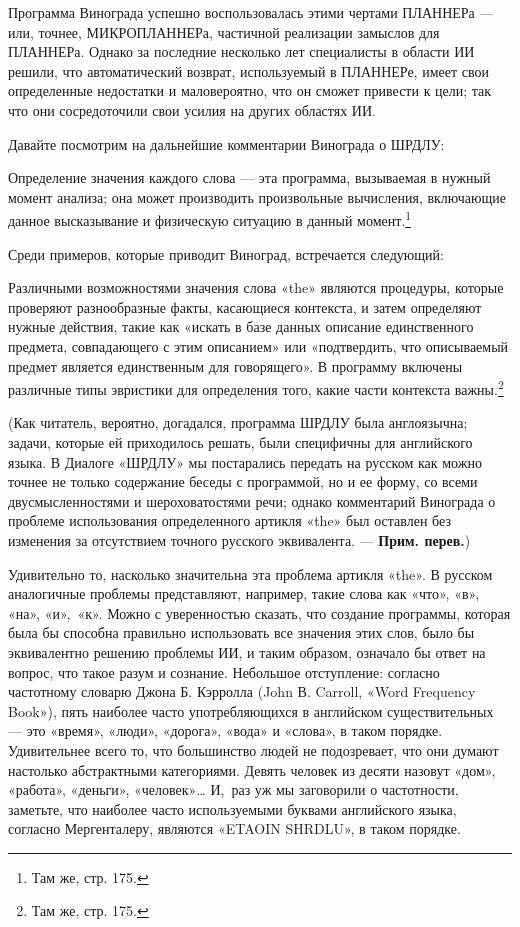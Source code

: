 \documentclass[../main.tex]{subfiles}
\begin{document}
Программа Винограда успешно воспользовалась этими чертами ПЛАННЕРа --- или, точнее, МИКРОПЛАННЕРа, частичной реализации замыслов для ПЛАННЕРа. Однако за последние несколько лет специалисты в области ИИ решили, что автоматический возврат, используемый в ПЛАННЕРе, имеет свои определенные недостатки и маловероятно, что он сможет привести к цели; так что они сосредоточили свои усилия на других областях ИИ.

Давайте посмотрим на дальнейшие комментарии Винограда о ШРДЛУ:

Определение значения каждого слова --- эта программа, вызываемая в нужный момент анализа; она может производить произвольные вычисления, включающие данное высказывание и физическую ситуацию в данный момент.\footnote{Там же, стр. 175.}

Среди примеров, которые приводит Виноград, встречается следующий:

Различными возможностями значения слова «the» являются процедуры, которые проверяют разнообразные факты, касающиеся контекста, и затем определяют нужные действия, такие как «искать в базе данных описание единственного предмета, совпадающего с этим описанием» или «подтвердить, что описываемый предмет является единственным для говорящего». В программу включены различные типы эвристики для определения того, какие части контекста важны.\footnote{Там же, стр. 175.}

(Как читатель, вероятно, догадался, программа ШРДЛУ была англоязычна; задачи, которые ей приходилось решать, были специфичны для английского языка. В Диалоге «ШРДЛУ» мы постарались передать на русском как можно точнее не только содержание беседы с программой, но и ее форму, со всеми двусмысленностями и шероховатостями речи; однако комментарий Винограда о проблеме использования определенного артикля «the» был оставлен без изменения за отсутствием точного русского эквивалента. --- \textbf{Прим. перев.})

Удивительно то, насколько значительна эта проблема артикля «the». В русском аналогичные проблемы представляют, например, такие слова как «что», «в», «на», «и»,~«к». Можно с уверенностью сказать, что создание программы, которая была бы способна правильно использовать все значения этих слов, было бы эквивалентно решению проблемы ИИ, и таким образом, означало бы ответ на вопрос, что такое разум и сознание. Небольшое отступление: согласно частотному словарю Джона Б. Кэрролла (John В. Carroll, «Word Frequency Book»), пять наиболее часто употребляющихся в английском существительных --- это «время», «люди», «дорога», «вода» и «слова», в таком порядке. Удивительнее всего то, что большинство людей не подозревает, что они думают настолько абстрактными категориями. Девять человек из десяти назовут «дом», «работа», «деньги», «человек»\ldots{} И,~раз уж мы заговорили о частотности, заметьте, что наиболее часто используемыми буквами английского языка, согласно Мергенталеру, являются «ETAOIN SHRDLU», в таком порядке.
\end{document}
